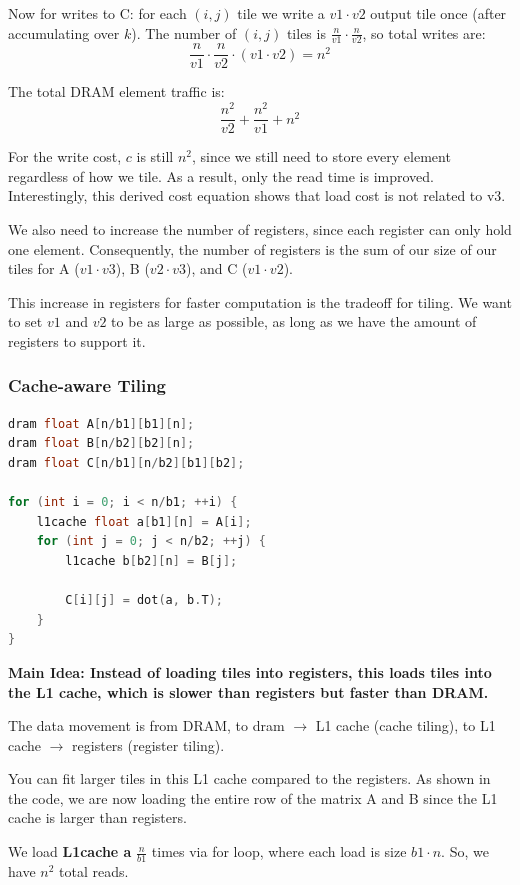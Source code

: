 \documentclass[twoside]{article}
\begin{document}
Now for writes to C: for each $(i, j)$ tile we write a $v1 \cdot v2$ output tile once (after accumulating over $k$). The number of $(i, j)$ tiles is $\frac{n}{v1} \cdot \frac{n}{v2}$, so total writes are:
$$
\frac{n}{v1} \cdot \frac{n}{v2} \cdot (v1 \cdot v2) = n^2
$$

The total DRAM element traffic is:
$$
\frac{n^2}{v2} + \frac{n^2}{v1} + n^2
$$

For the write cost, $c$ is still $n^2$, since we still need to store every element regardless of how we tile. As a result, only the read time is improved. Interestingly, this derived cost equation shows that load cost is not related to v3.

We also need to increase the number of registers, since each register can only hold one element. Consequently, the number of registers is the sum of our size of our tiles for A ($v1 \cdot v3$), B ($v2 \cdot v3$), and C ($v1 \cdot v2$).

This increase in registers for faster computation is the tradeoff for tiling. We want to set $v1$ and $v2$ to be as large as possible, as long as we have the amount of registers to support it.

\subsubsection{Cache-aware Tiling}
\begin{lstlisting}[language=C++]
dram float A[n/b1][b1][n];
dram float B[n/b2][b2][n];
dram float C[n/b1][n/b2][b1][b2];

for (int i = 0; i < n/b1; ++i) {
    l1cache float a[b1][n] = A[i];
    for (int j = 0; j < n/b2; ++j) {
        l1cache b[b2][n] = B[j];
        
        C[i][j] = dot(a, b.T);
    }
}
\end{lstlisting}

\textbf{Main Idea: Instead of loading tiles into registers, this loads tiles into the L1 cache, which is slower than registers but faster than DRAM.}

The data movement is from DRAM, to dram $\rightarrow$ L1 cache (cache tiling), to L1 cache $\rightarrow$ registers (register tiling).

You can fit larger tiles in this L1 cache compared to the registers. As shown in the code, we are now loading the entire row of the matrix A and B since the L1 cache is larger than registers.

We load \textbf{L1cache a} $\frac{n}{b1}$ times via for loop, where each load is size $b1 \cdot n$. So, we have $n^2$ total reads.
\end{document}
